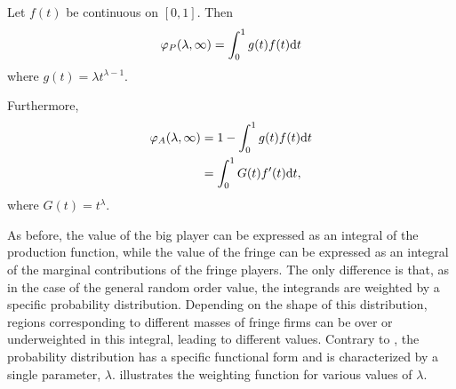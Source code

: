 \begin{proposition}
    \label{prop:one_sided_weighted}
    Let $f(t)$ be continuous on $[0, 1]$. Then
    \begin{align*}
        \varphi_P(\lambda, \infty) = \int_0^1 g(t) f(t) \mathrm{d}t
    \end{align*}
    where $g(t) = \lambda t^{\lambda - 1}$.

    Furthermore,
    \begin{align*}
        \varphi_A(\lambda, \infty) &= 1 - \int_0^1 g(t) f(t) \mathrm{d}t \\
                                &= \int_0^1 G(t) f'(t) \mathrm{d}t,
    \end{align*}
    where $G(t) = t^\lambda$.
\end{proposition}

As before, the value of the big player can be expressed as an integral of the production function, while the value of the fringe can be expressed as an integral of the marginal contributions of the fringe players.
The only difference is that, as in the case of the general random order value, the integrands are weighted by a specific probability distribution.
Depending on the shape of this distribution, regions corresponding to different masses of fringe firms can be over or underweighted in this integral, leading to different values.
Contrary to , the probability distribution has a specific functional form and is characterized by a single parameter, $\lambda$.
 illustrates the weighting function for various values of $\lambda$.

